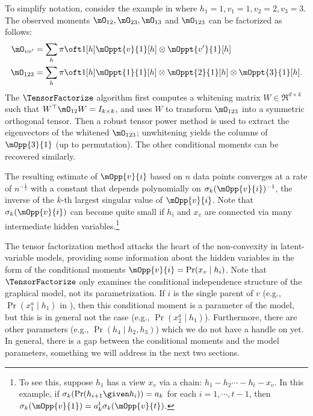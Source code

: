 To simplify notation, consider the example in  where $h_1=1,v_1=1,v_2=2,v_3=3$.
The observed moments $\mO_{12}, \mO_{23}, \mO_{13}$ and $\mO_{123}$ can be factorized as follows:
\begin{align*}
  \mO_{vv'} &= \sum_h {\pi \oft 1}[h] {\mOppt{v}{1}}[h] \otimes {\mOppt{v'}{1}}[h] \\ %
  \mO_{123} &= \sum_h {\pi \oft 1}[h] {\mOppt{1}{1}}[h] \otimes {\mOppt{2}{1}}[h] \otimes  {\mOppt{3}{1}}[h].
\end{align*}
The $\TensorFactorize$ algorithm first computes a whitening matrix $W \in
  \Re^{d \times k}$ such that $W^\top \mO_{12} W = I_{k \times k}$,
  and uses $W$ to transform $\mO_{123}$ into a symmetric orthogonal tensor.  
Then a robust tensor power method is used to extract the eigenvectors
of the whitened $\mO_{123}$; unwhitening yields the columns of $\mOpp{3}{1}$
(up to permutation).
The other conditional moments can be recovered similarly.

  The resulting estimate of %
  $\mOpp{v}{i}$ based on $n$ data points converges at a rate of $n^{-\frac12}$ with a constant
  that depends polynomially on $\sigma_k(\mOpp{v}{i})^{-1}$,
  the inverse of the $k$-th largest singular value of $\mOpp{v}{i}$.
Note that $\sigma_{k}(\mOpp{v}{i})$ can become quite
small if $h_i$ and $x_v$ are connected via many intermediate hidden
variables.\footnote{To see this, suppose $h_1$ has a view $x_v$ via a chain:
$h_1 - h_2 \cdots - h_t - x_v$. In this example, if
$\sigma_k(\Pr(h_{i+1} \given h_{i})) = a_k$ for each $i = 1,
\cdots, t-1$, then $\sigma_k(\mOpp{v}{1}) = a_k^t \sigma_k(\mOpp{v}{t})$.}

The tensor factorization method attacks the heart of the non-convexity
  in latent-variable models, providing some information about the hidden variables
  in the form of the conditional moments $\mOpp{v}{i} = \Pr(x_v \mid h_i)$.
  Note that $\TensorFactorize$ only examines the conditional independence structure
  of the graphical model, not its parametrization.
  If $i$ is the single parent of $v$ (e.g., $\Pr(x_1^a \mid h_1)$ in ),
  then this conditional moment is a parameter of the model,
  but this is in general not the case (e.g., $\Pr(x_2^a \mid h_1)$).
  Furthermore, there are other parameters (e.g., $\Pr(h_4 \mid h_2, h_3)$) which we do
  not have a handle on yet.
  In general, there is a gap between the conditional moments
  and the model parameters,
  something we will address in the next two sections.


